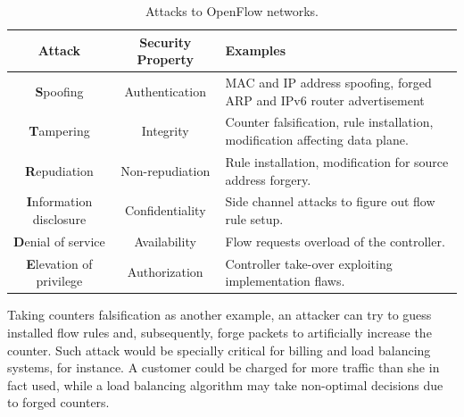 {\renewcommand{\arraystretch}{1.4}
\begin{table}[!htp]
\caption{Attacks to OpenFlow networks.}
\label{tab:securitythreatsopenflow}
\begin{center}
\footnotesize
\begin{tabularx}{.85\textwidth}{ccX}
\hline
\textbf{Attack}  & \textbf{Security Property} & \textbf{Examples} \\\hline
\textbf{S}poofing & Authentication & MAC and IP address spoofing, forged ARP and IPv6 router advertisement\\\hline
\textbf{T}ampering & Integrity & Counter falsification, rule installation, modification affecting data plane.\\\hline
\textbf{R}epudiation & Non-repudiation & Rule installation, modification for source address forgery.\\\hline
\textbf{I}nformation disclosure & Confidentiality & Side channel attacks to figure out flow rule setup. \\\hline
\textbf{D}enial of service & Availability &  Flow requests overload of the controller. \\\hline
\textbf{E}levation of privilege & Authorization & Controller take-over exploiting implementation flaws. \\\hline
\end{tabularx}
\end{center}
\end{table}
}

Taking counters falsification as another example, an attacker can try to guess installed flow 
rules and, subsequently, forge packets to artificially increase the counter.
Such attack would be specially critical for billing and load balancing systems, for instance.
A customer could be charged for more traffic than she in fact used, while a load balancing algorithm may take non-optimal decisions due to forged counters. 

